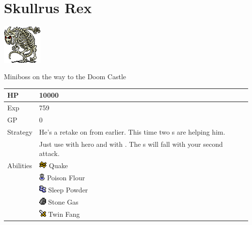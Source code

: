 \section{Skullrus Rex}
\label{monster:skullrus_rex}

\includegraphics[height=2cm,keepaspectratio]{./resources/monster/skullrus_rex}

Miniboss on the way to the Doom Castle

\begin{longtable}{ l p{9cm} }
	HP
	& 10000
\\ \hline
	Exp
	& 759
\\ \hline
	GP
	& 0
\\ \hline
	Strategy
	& He’s a retake on \nameref{monster:flamerus_rex} from earlier. This time two \nameref{monster:shadow}s are helping him. \\
	& Just use \nameref{spell:flare} with hero and \nameref{spell:white} with \nameref{char:phoebe}. The \nameref{monster:shadow}s will fall with your second attack.
\\ \hline
	Abilities
	& \includegraphics[height=1em,keepaspectratio]{./resources/effects/earth} Quake \\
	& \includegraphics[height=1em,keepaspectratio]{./resources/effects/poison} Poison Flour \\
	& \includegraphics[height=1em,keepaspectratio]{./resources/effects/sleep} Sleep Powder \\
	& \includegraphics[height=1em,keepaspectratio]{./resources/effects/petrify} Stone Gas \\
	& \includegraphics[height=1em,keepaspectratio]{./resources/effects/damage} Twin Fang
\end{longtable}
